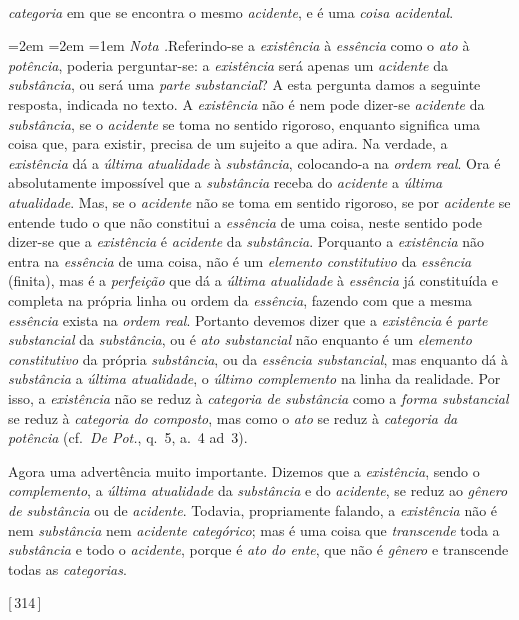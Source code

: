 \documentclass[12pt,a4paper]{article}
\newcommand{\pg}[1]{\thinspace\textup{[\,#1\,]}\thinspace}
\renewcommand\footnote[1]{%
    \stepcounter{footnote}\textsuperscript{\thefootnote}%
    \par
    {\footnotesize
     \leftskip=2em \rightskip=2em \parindent=1em
     \addvspace{\medskipamount}%
     \noindent\textit{Nota \thefootnote.}\enspace #1\par
     \addvspace{\medskipamount}}%
  }
\begin{document}
\emph{categoria} em que se encontra o mesmo \emph{acidente}, e é uma \emph{coisa
acidental}.\footnote{Referindo-se a \emph{existência} à \emph{essência} como o
\emph{ato} à \emph{potência}, poderia perguntar-se: a \emph{existência} será
apenas um \emph{acidente} da \emph{substância}, ou será uma \emph{parte
substancial}? \textemdash{} A esta pergunta damos a seguinte resposta, indicada
no texto. A \emph{existência} não é nem pode dizer-se \emph{acidente} da
\emph{substância}, se o \emph{acidente} se toma no sentido rigoroso, enquanto
significa uma coisa que, para existir, precisa de um sujeito a que adira. Na
verdade, a \emph{existência} dá a \emph{última atualidade} à \emph{substância},
colocando-a na \emph{ordem real}. Ora é absolutamente impossível que a
\emph{substância} receba do \emph{acidente} a \emph{última atualidade}.
\textemdash{} Mas, se o \emph{acidente} não se toma em sentido rigoroso, se por
\emph{acidente} se entende tudo o que não constitui a \emph{essência} de uma
coisa, neste sentido pode dizer-se que a \emph{existência} é \emph{acidente} da
\emph{substância}. Porquanto a \emph{existência} não entra na \emph{essência} de
uma coisa, não é um \emph{elemento constitutivo} da \emph{essência} (finita),
mas é a \emph{perfeição} que dá a \emph{última atualidade} à \emph{essência} já
constituída e completa na própria linha ou ordem da \emph{essência}, fazendo
com que a mesma \emph{essência} exista na \emph{ordem real}. Portanto devemos
dizer que a \emph{existência} é \emph{parte substancial} da \emph{substância},
ou é \emph{ato substancial} \textemdash{} não enquanto é um \emph{elemento
constitutivo} da própria \emph{substância}, ou da \emph{essência substancial},
\textemdash{} mas enquanto dá à \emph{substância} a \emph{última atualidade}, o
\emph{último complemento} na linha da realidade. Por isso, a \emph{existência}
não se reduz à \emph{categoria de substância} como a \emph{forma substancial}
se reduz à \emph{categoria do composto}, \textemdash{} mas como o \emph{ato} se
reduz à \emph{categoria da potência} (cf.\ \emph{De Pot.}, q.~5, a.~4 ad~3).

  Agora uma advertência muito importante. Dizemos que a \emph{existência}, sendo
  o \emph{complemento}, a \emph{última atualidade} da \emph{substância} e do
  \emph{acidente}, se reduz ao \emph{gênero de substância} ou de
  \emph{acidente}. Todavia, propriamente falando, a \emph{existência} não é nem
  \emph{substância} nem \emph{acidente categórico}; mas é uma coisa que
  \emph{transcende} toda a \emph{substância} e todo o \emph{acidente}, porque é
  \emph{ato do ente}, que não é \emph{gênero} e transcende todas as
  \emph{categorias}.} \pg{314}
\end{document}
